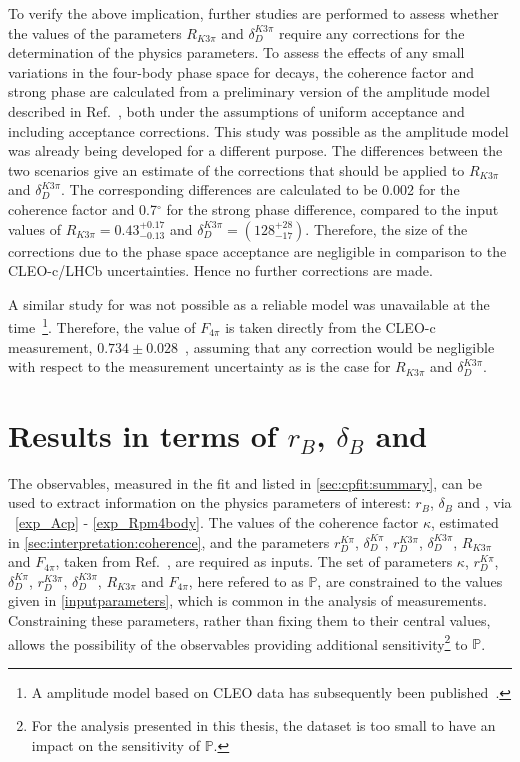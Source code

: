 To verify the above implication, further studies are performed to assess whether the values of the parameters $R_{K3\pi}$ and $\delta_D^{K3\pi}$ require any corrections for the determination of the physics parameters. To assess the effects of any small variations in the four-body phase space for \kpipipi decays, the coherence factor and strong phase are calculated from a preliminary version of the \decay{\Dz}{\Km\pip\pim\pip} amplitude model described in Ref.~\cite{LHCb-PAPER-2017-040}, both under the assumptions of uniform acceptance and including \lhcb acceptance corrections. This study was possible as the \decay{\Dz}{\Km\pip\pim\pip} amplitude model was already being developed for a different purpose. The differences between the two scenarios give an estimate of the corrections that should be applied to $R_{K3\pi}$ and $\delta_D^{K3\pi}$. The corresponding differences are calculated to be 0.002 for the coherence factor and 0.7$^{\circ}$ for the strong phase difference, compared to the input values of $R_{K3\pi} = 0.43^{+0.17}_{-0.13}$ and $\delta_D^{K3\pi} = \left(128^{+28}_{-17}\right)$. Therefore, the size of the corrections due to the \lhcb phase space acceptance are negligible in comparison to the CLEO-c/LHCb uncertainties. Hence no further corrections are made. 

A similar study for \decay{\Dz}{\pim\pip\pim\pip} was not possible as a reliable model was unavailable at the time~\footnote{A \decay{\Dz}{\pim\pip\pim\pip} amplitude model based on CLEO data has subsequently been published~\cite{4piamplitude}.}. Therefore, the value of $F_{4\pi}$ is taken directly from the CLEO-c measurement, $0.734 \pm 0.028$~\cite{charm4pi}, assuming that any correction would be negligible with respect to the measurement uncertainty as is the case for $R_{K3\pi}$ and $\delta_D^{K3\pi}$. 

\section{Results in terms of $r_B$, $\delta_B$ and \Pgamma}
\label{sec:interpretation:gammadini}

The \CP observables, measured in the \CP fit and listed in \sect\ref{sec:cpfit:summary}, can be used to extract information on the physics parameters of interest: $r_B$, $\delta_B$ and \Pgamma, via \eqns~\ref{exp_Acp} - \ref{exp_Rpm4body}. The values of the coherence factor $\kappa$, estimated in \sect\ref{sec:interpretation:coherence}, and the parameters $r_D^{K\pi}$, $\delta_D^{K\pi}$, $r_D^{K3\pi}$, $\delta_D^{K3\pi}$, $R_{K3\pi}$ and $F_{4\pi}$, taken from Ref.~\cite{HFAG,charmk3pi,charmk3pi_errata,LHCb-PAPER-2015-057,charm4pi}, are required as inputs. The set of parameters $\kappa$, $r_D^{K\pi}$, $\delta_D^{K\pi}$, $r_D^{K3\pi}$, $\delta_D^{K3\pi}$, $R_{K3\pi}$ and $F_{4\pi}$, here refered to as $\mathbb{P}$, are constrained to the values given in \tab\ref{inputparameters}, which is common in the analysis of \lhcb measurements. Constraining these parameters, rather than fixing them to their central values, allows the possibility of the \CP observables providing additional sensitivity\footnote{For the analysis presented in this thesis, the dataset is too small to have an impact on the sensitivity of $\mathbb{P}$.} to $\mathbb{P}$.


